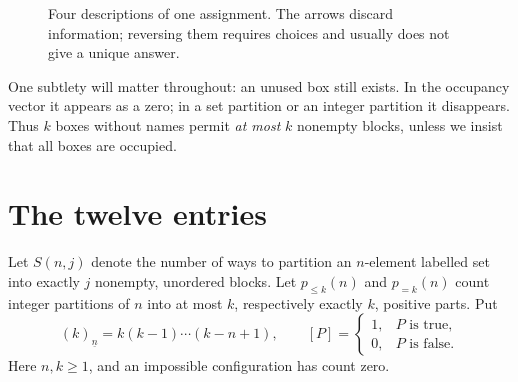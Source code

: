 \begin{figure}[htbp]
\centering
{}
\caption{Four descriptions of one assignment. The arrows discard information; reversing them requires choices and usually does not give a unique answer.}
\end{figure}

One subtlety will matter throughout: an unused box still exists. In the occupancy vector it appears as a zero; in a set partition or an integer partition it disappears. Thus \(k\) boxes without names permit \emph{at most} \(k\) nonempty blocks, unless we insist that all boxes are occupied.

\section{The twelve entries}

Let \(S(n,j)\) denote the number of ways to partition an \(n\)-element labelled set into exactly \(j\) nonempty, unordered blocks. Let \(p_{\le k}(n)\) and \(p_{=k}(n)\) count integer partitions of \(n\) into at most \(k\), respectively exactly \(k\), positive parts. Put
\[
 (k)_{\underline n}=k(k-1)\cdots(k-n+1),
 \qquad [P]=\begin{cases}1,&P\text{ is true},\\0,&P\text{ is false}.\end{cases}
\]
Here \(n,k\ge1\), and an impossible configuration has count zero.

